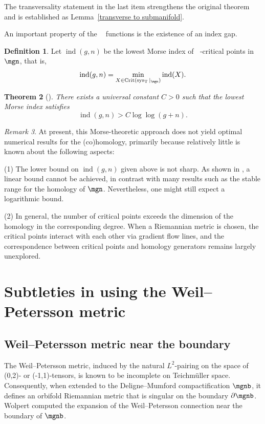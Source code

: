 \documentclass[12pt]{amsart}
\newtheorem{theorem}{Theorem}[section]
\theoremstyle{remark}
\newtheorem{remark}[theorem]{Remark}
\theoremstyle{definition}
\newtheorem{definition}[theorem]{Definition}
\DeclareMathOperator{\crit}{Crit}
\DeclareMathOperator{\ind}{ind}
\DeclareMathOperator{\syst}{sys_T}
\numberwithin{equation}{section}
\begin{document}
The transversality statement in the last item strengthens the original theorem and is established as Lemma~\ref{transverse to submanifold}.

An important property of the $\syst$ functions is the existence of an index gap.

\begin{definition}
    Let $\ind(g,n)$ be the lowest Morse index of $\syst$-critical points in $\mgn$, that is,
    \[
    \ind(g,n)=\min_{X\in\crit(\syst|_{\mgn})}\ind(X).
    \]
\end{definition}

\begin{theorem}[\cite{chen2023index}]
\label{index gap theorem}
There exists a universal constant $C>0$ such that the lowest Morse index satisfies
\[
\ind(g,n) > C \log\log(g+n).
\]
\end{theorem}


\begin{remark}
\label{limitation}
    At present, this Morse-theoretic approach does not yield optimal numerical results for the (co)homology, primarily because relatively little is known about the following aspects:

    (1) The lower bound on $\ind(g,n)$ given above is not sharp. As shown in \cite{bourque2020hyperbolic}, a linear bound cannot be achieved, in contrast with many results such as the stable range for the homology of $\mgn$. Nevertheless, one might still expect a logarithmic bound.

    (2) In general, the number of critical points exceeds the dimension of the homology in the corresponding degree. When a Riemannian metric is chosen, the critical points interact with each other via gradient flow lines, and the correspondence between critical points and homology generators remains largely unexplored.
\end{remark}




\section{Subtleties in using the Weil--Petersson metric}
\label{sec:wp-metric}

\subsection{Weil--Petersson metric near the boundary}

The Weil--Petersson metric, induced by the natural $L^2$-pairing on the space of (0,2)- or (-1,1)-tensors, is known to be incomplete on Teichmüller space. Consequently, when extended to the Deligne--Mumford compactification $\mgnb$, it defines an orbifold Riemannian metric that is singular on the boundary $\partial\mgnb$. Wolpert \cite{wolpert2009extension} computed the expansion of the Weil--Petersson connection near the boundary of $\mgnb$.
\end{document}
